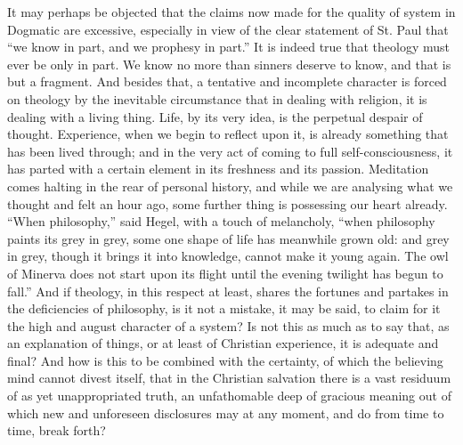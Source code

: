 \documentclass[12pt,a5paper]{article}
\begin{document}
It may perhaps be objected that the claims now made
for the quality of system in Dogmatic are excessive, especially
in view of the clear statement of St. Paul that ``we
know in part, and we prophesy in part.'' It is indeed true
that theology must ever be only in part. We know no
more than sinners deserve to know, and that is but a
fragment. And besides that, a tentative and incomplete
character is forced on theology by the inevitable circumstance
that in dealing with religion, it is dealing with a
living thing. Life, by its very idea, is the perpetual despair
of thought. Experience, when we begin to reflect upon it,
is already something that has been lived through; and in the
very act of coming to full self-consciousness, it has parted
with a certain element in its freshness and its passion.
Meditation comes halting in the rear of personal history,
and while we are analysing what we thought and felt
an hour ago, some further thing is possessing our heart
already. ``When philosophy,'' said Hegel, with a touch
of melancholy, ``when philosophy paints its grey in grey,
some one shape of life has meanwhile grown old: and grey
in grey, though it brings it into knowledge, cannot make it
young again. The owl of Minerva does not start upon its
flight until the evening twilight has begun to fall.'' And
if theology, in this respect at least, shares the fortunes and
partakes in the deficiencies of philosophy, is it not a mistake,
it may be said, to claim for it the high and august character
of a system? Is not this as much as to say that, as an
explanation of things, or at least of Christian experience, it
is adequate and final? And how is this to be combined with
the certainty, of which the believing mind cannot divest
itself, that in the Christian salvation there is a vast residuum
of as yet unappropriated truth, an unfathomable deep of
gracious meaning out of which new and unforeseen disclosures
may at any moment, and do from time to time,
break forth?
\end{document}
